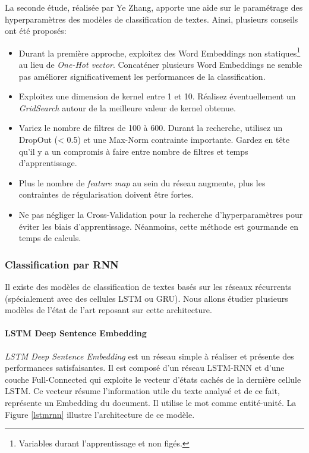 \noindent La seconde étude, réalisée par Ye Zhang\cite{analysiscnn}, apporte une aide sur le paramétrage des hyperparamètres des modèles de classification de textes. Ainsi, plusieurs conseils ont été proposés:
\begin{itemize}
    \item Durant la première approche, exploitez des Word Embeddings non statiques\footnote{Variables durant l'apprentissage et non figés.} au lieu de \textit{One-Hot vector}. Concaténer plusieurs Word Embeddings ne semble pas améliorer significativement les performances de la classification.

    \item Exploitez une dimension de kernel entre 1 et 10. Réalisez éventuellement un \textit{GridSearch} autour de la meilleure valeur de kernel obtenue.

    \item Variez le nombre de filtres de 100 à 600. Durant la recherche, utilisez un DropOut (< 0.5) et une Max-Norm contrainte importante. Gardez en tête qu'il y a un compromis à faire entre nombre de filtres et temps d'apprentissage.

    \item Plus le nombre de \textit{feature map} au sein du réseau augmente, plus les contraintes de régularisation doivent être fortes.

    \item Ne pas négliger la Cross-Validation pour la recherche d'hyperparamètres pour éviter les biais d'apprentissage. Néanmoins, cette méthode est gourmande en temps de calculs.
\end{itemize}

\subsubsection{Classification par RNN}
Il existe des modèles de classification de textes basés sur les réseaux récurrents (spécialement avec des cellules LSTM ou GRU). Nous allons étudier plusieurs modèles de l'état de l'art reposant sur cette architecture.

\paragraph{LSTM Deep Sentence Embedding}
\textit{LSTM Deep Sentence Embedding}\cite{rnnsent} est un réseau simple à réaliser et présente des performances satisfaisantes. Il est composé d'un réseau LSTM-RNN et d'une couche Full-Connected qui exploite le vecteur d'états cachés de la dernière cellule LSTM. Ce vecteur résume l'information utile du texte analysé et de ce fait, représente un Embedding du document. Il utilise le mot comme entité-unité. La Figure \ref{lstmrnn} illustre l'architecture de ce modèle.\\

